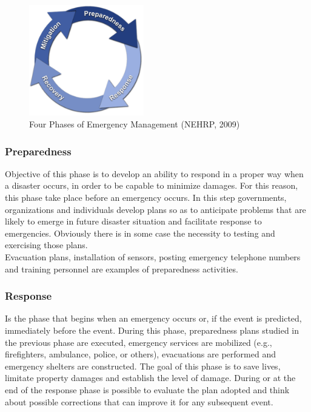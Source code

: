 \begin{figure}[h]
    \begin{center}
      \includegraphics[width=5cm]{img/emergencyCycle.png}
      \caption{Four Phases of Emergency Management (NEHRP, 2009)}
      \label{fig:emergencyCycle}
    \end{center}
\end{figure}
\vspace*{0.3cm}

\subsubsection{Preparedness}
Objective of this phase is to develop an ability to respond in a proper way when a disaster occurs, in order to be capable to minimize damages. For this reason, this phase take place before an emergency occurs. In this step governments, organizations and individuals develop plans so as to anticipate problems that are likely to emerge in future disaster situation and facilitate response to emergencies. Obviously there is in some case the necessity to testing and exercising those plans.
\\
Evacuation plans, installation of sensors, posting emergency telephone numbers and training personnel are examples of preparedness activities. 

\subsubsection{Response}
Is the phase that begins when an emergency occurs or, if the event is predicted, immediately before the event. During this phase, preparedness plans studied in the previous phase are executed, emergency services are mobilized (e.g., firefighters, ambulance, police, or others), evacuations are performed and emergency shelters are constructed. The goal of this phase is to save lives, limitate property damages and establish the level of damage. During or at the end of the response phase is possible to evaluate the plan adopted and think about possible corrections that can improve it for any subsequent event. 


